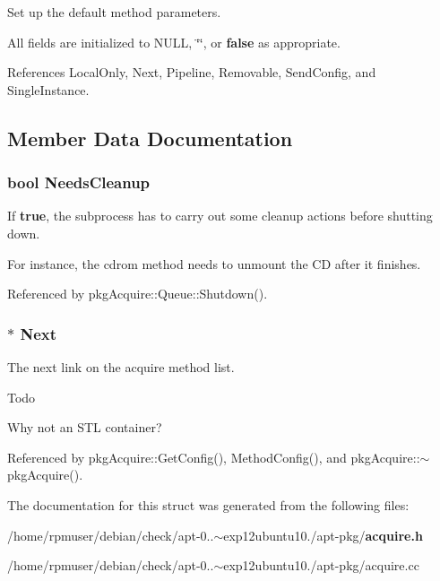 \-Set up the default method parameters. 

\-All fields are initialized to \-N\-U\-L\-L, \char`\"{}\char`\"{}, or {\bfseries false} as appropriate. 

\-References \-Local\-Only, \-Next, \-Pipeline, \-Removable, \-Send\-Config, and \-Single\-Instance.



\subsection{\-Member \-Data \-Documentation}
\subsubsection[{\-Needs\-Cleanup}]{\setlength{\rightskip}{0pt plus 5cm}bool {\bf \-Needs\-Cleanup}}\label{structpkgAcquire_1_1MethodConfig_a18ab15b6a105e10118c35973765cce34}


\-If {\bfseries true}, the subprocess has to carry out some cleanup actions before shutting down. 

\-For instance, the cdrom method needs to unmount the \-C\-D after it finishes. 

\-Referenced by pkg\-Acquire\-::\-Queue\-::\-Shutdown().

\subsubsection[{\-Next}]{$\ast$ {\bf \-Next}}\label{structpkgAcquire_1_1MethodConfig_add1daf6c866236479bdac390ed41f80a}


\-The next link on the acquire method list. 

\begin{DoxyRefDesc}{\-Todo}
\item[{\bf \-Todo}]\-Why not an \-S\-T\-L container? \end{DoxyRefDesc}


\-Referenced by pkg\-Acquire\-::\-Get\-Config(), \-Method\-Config(), and pkg\-Acquire\-::$\sim$pkg\-Acquire().



\-The documentation for this struct was generated from the following files\-:\begin{DoxyCompactItemize}
\item 
/home/rpmuser/debian/check/apt-\/0..$\sim$exp12ubuntu10./apt-\/pkg/{\bf acquire.\-h}\item 
/home/rpmuser/debian/check/apt-\/0..$\sim$exp12ubuntu10./apt-\/pkg/acquire.\-cc\end{DoxyCompactItemize}
